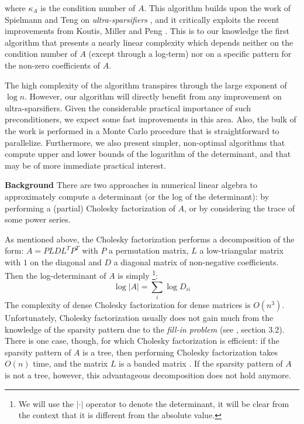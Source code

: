 where $\kappa_{A}$ is the condition number of $A$. This algorithm
builds upon the work of Spielmann and Teng on \emph{ultra-sparsifiers}
\cite{Spielman2009a}, and it critically exploits the recent improvements
from Koutis, Miller and Peng \cite{Koutis2010}. This is to our knowledge
the first algorithm that presents a nearly linear complexity which
depends neither on the condition number of $A$ (except through a
log-term) nor on a specific pattern for the non-zero coefficients
of $A$.

The high complexity of the algorithm transpires through the large
exponent of $\log n$. However, our algorithm will directly benefit
from any improvement on ultra-sparsifiers. Given the considerable
practical importance of such preconditioners, we expect some fast
improvements in this area. Also, the bulk of the work is performed
in a Monte Carlo procedure that is straightforward to parallelize.
Furthermore, we also present simpler, non-optimal algorithms that
compute upper and lower bounds of the logarithm of the determinant,
and that may be of more immediate practical interest.

\textbf{Background} There are two approaches in numerical linear algebra
to approximately compute a determinant (or the log of the determinant):
by performing a (partial) Cholesky factorization of $A$, or by considering
the trace of some power series.

As mentioned above, the Cholesky factorization performs a decomposition
of the form: $A=PLDL^{T}P^{T}$ with $P$ a permutation matrix, $L$
a low-triangular matrix with $1$ on the diagonal and $D$ a diagonal
matrix of non-negative coefficients. Then the log-determinant of $A$
is simply%
\footnote{We will use the $\left|\cdot\right|$ operator to denote the determinant,
it will be clear from the context that it is different from the absolute
value.%
}: 
\[
\log\left|A\right|=\sum_{i}\log D_{ii}
\]
The complexity of dense Cholesky factorization for dense matrices
is $O\left(n^{3}\right)$. Unfortunately, Cholesky factorization usually
does not gain much from the knowledge of the sparsity pattern due
to the \emph{fill-in problem} (see \cite{meurant1999computer}, section
3.2). There is one case, though, for which Cholesky factorization
is efficient: if the sparsity pattern of $A$ is a tree, then performing
Cholesky factorization takes $O\left(n\right)$ time, and the matrix
$L$ is a banded matrix \cite{liu1990eliminationtrees}. If the sparsity
pattern of $A$ is not a tree, however, this advantageous decomposition
does not hold anymore.

